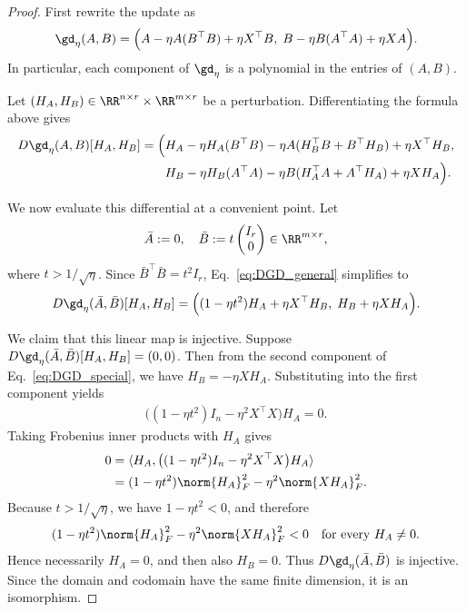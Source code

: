 \documentclass{article}
\begin{document}
\begin{proof}
First rewrite the update as
\begin{align}
\gd_\eta(A,B)
=
\Bigl(
A - \eta A(B^\top B) + \eta X^\top B,\;
B - \eta B(A^\top A) + \eta XA
\Bigr).
\end{align}
In particular, each component of $\gd_\eta$ is a polynomial in the entries of $(A,B)$.

Let $(H_A,H_B)\in \RR^{n\times r}\times \RR^{m\times r}$ be a perturbation.
Differentiating the formula above gives
\begin{align}
D\gd_\eta(A,B)[H_A,H_B]
=
\Bigl(
&H_A - \eta H_A(B^\top B) - \eta A(H_B^\top B + B^\top H_B) + \eta X^\top H_B, \notag\\
&H_B - \eta H_B(A^\top A) - \eta B(H_A^\top A + A^\top H_A) + \eta XH_A
\Bigr).
\label{eq:DGD_general}
\end{align}

We now evaluate this differential at a convenient point.
Let
\begin{align}
\bar A := 0,
\quad
\bar B := t\begin{pmatrix} I_r \\ 0 \end{pmatrix}\in \RR^{m\times r},
\end{align}
where $t>1/\sqrt{\eta}$.
Since $\bar B^\top \bar B = t^2 I_r$,  Eq.~\eqref{eq:DGD_general} simplifies to
\begin{align}
D\gd_\eta(\bar A,\bar B)[H_A,H_B]
=
\Bigl(
(1-\eta t^2)H_A + \eta X^\top H_B,\;
H_B + \eta XH_A
\Bigr).
\label{eq:DGD_special}
\end{align}

We claim that this linear map is injective.
Suppose $D\gd_\eta(\bar A,\bar B)[H_A,H_B] = (0,0)$.
Then from the second component of  Eq.~\eqref{eq:DGD_special}, we have $H_B = -\eta XH_A$.
Substituting into the first component yields
\begin{align}
\bigl((1-\eta t^2)I_n - \eta^2 X^\top X\bigr)H_A = 0.
\end{align}
Taking Frobenius inner products with $H_A$ gives
\begin{align}
0
&=
\langle H_A,\bigl((1-\eta t^2)I_n - \eta^2 X^\top X\bigr)H_A\rangle \\
&=
(1-\eta t^2)\norm{H_A}_F^2 - \eta^2 \norm{XH_A}_F^2.
\end{align}
Because $t>1/\sqrt{\eta}$, we have $1-\eta t^2<0$, and therefore
\begin{align}
(1-\eta t^2)\norm{H_A}_F^2 - \eta^2 \norm{XH_A}_F^2 < 0
\quad\text{for every } H_A\neq 0.
\end{align}
Hence necessarily $H_A=0$, and then also $H_B=0$.
Thus $D\gd_\eta(\bar A,\bar B)$ is injective.
Since the domain and codomain have the same finite dimension, it is an isomorphism.


\end{proof}
\end{document}
